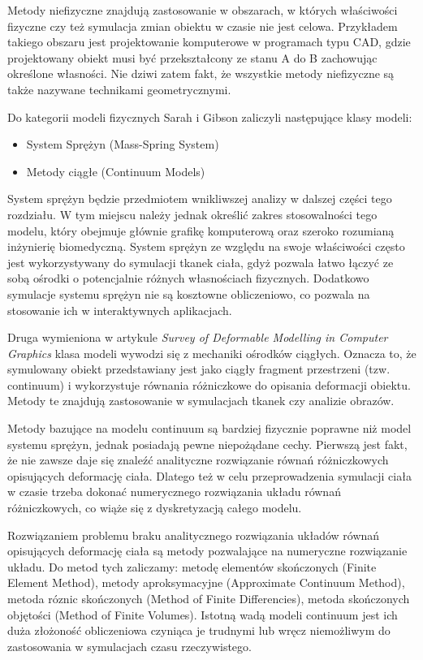 Metody niefizyczne znajdują zastosowanie w obszarach, w których właściwości
fizyczne czy też symulacja zmian obiektu w czasie nie jest celowa. Przykładem
takiego obszaru jest projektowanie komputerowe w programach typu CAD, gdzie
projektowany obiekt musi być przekształcony ze stanu A do B zachowując określone
własności. Nie dziwi zatem fakt, że wszystkie metody niefizyczne są także 
nazywane technikami geometrycznymi.

Do kategorii modeli fizycznych Sarah i Gibson zaliczyli następujące klasy modeli:
\begin{itemize}
\item System Sprężyn (Mass-Spring System)
\item Metody ciągłe (Continuum Models)
\end{itemize}

System sprężyn będzie przedmiotem wnikliwszej analizy w dalszej części tego
rozdziału. W tym miejscu należy jednak określić zakres stosowalności tego
modelu, który obejmuje głównie grafikę komputerową oraz szeroko rozumianą
inżynierię biomedyczną. System sprężyn ze względu na swoje właściwości 
często jest wykorzystywany do symulacji tkanek ciała, gdyż pozwala łatwo łączyć ze
sobą ośrodki o potencjalnie różnych własnościach fizycznych. Dodatkowo symulacje
systemu sprężyn nie są kosztowne obliczeniowo, co pozwala na stosowanie ich w
interaktywnych aplikacjach.

Druga wymieniona w artykule \textit{Survey of Deformable Modelling in Computer Graphics}
klasa modeli wywodzi się z mechaniki ośrodków
ciągłych. Oznacza to, że symulowany obiekt przedstawiany jest jako ciągły
fragment przestrzeni (tzw. continuum) i wykorzystuje równania różniczkowe do
opisania deformacji obiektu. Metody te znajdują zastosowanie w symulacjach
tkanek czy analizie obrazów.\cite{TR97-19}

Metody bazujące na modelu continuum są bardziej fizycznie poprawne niż model
systemu sprężyn\cite{TR97-19}, jednak posiadają pewne niepożądane cechy.
Pierwszą jest fakt, że nie zawsze daje się znaleźć analityczne rozwiązanie
równań różniczkowych opisujących deformację ciała. Dlatego też w celu
przeprowadzenia symulacji ciała w czasie trzeba dokonać numerycznego rozwiązania
układu równań różniczkowych, co wiąże się z dyskretyzacją całego modelu.

Rozwiązaniem problemu braku analitycznego rozwiązania układów równań opisujących
deformację ciała są metody pozwalające na numeryczne rozwiązanie układu. Do
metod tych zaliczamy: metodę elementów skończonych (Finite Element Method),
 metody aproksymacyjne (Approximate Continuum Method), metoda róznic skończonych
 (Method of Finite Differencies), metoda skończonych objętości (Method of Finite
 Volumes). Istotną wadą modeli continuum jest ich duża złożoność obliczeniowa
czyniąca je trudnymi lub wręcz niemożliwym do zastosowania w symulacjach czasu
rzeczywistego.

